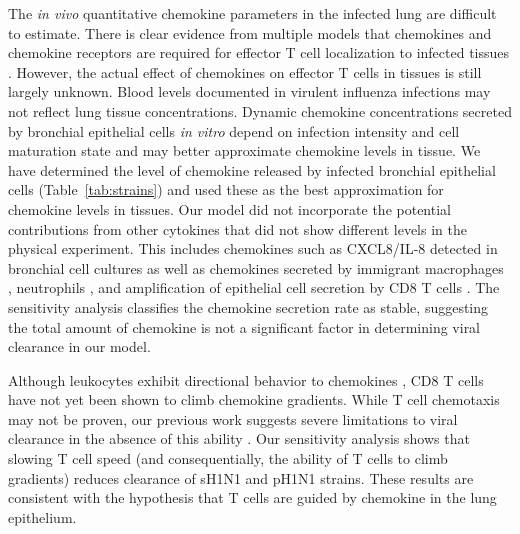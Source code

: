 \documentclass[preprint,10pt,numbers]{elsarticle}
\begin{document}
The \textit{in vivo} quantitative chemokine parameters in the infected lung are difficult to estimate.  There is clear evidence from multiple models that chemokines and chemokine receptors are required for effector T cell localization to infected tissues \citep{Christensen2004, Christensen2006, Dawson2000, DeLemos2005, Fadel2008, Gadhamsetty2014, Groom2011a, Groom2011, Hsieh2006, Klein2005, Kohlmeier2009, Kohlmeier2011, Thapa2008, Wareing2004, Wuest2008, Pawelek2012}. However, the actual effect of chemokines on effector T cells in tissues is still largely unknown.  Blood levels documented in virulent influenza infections \citep{DeJong2006} may not reflect lung tissue concentrations.  Dynamic chemokine concentrations secreted by bronchial epithelial cells \textit{in vitro} depend on infection intensity and cell maturation state \citep{Mitchell2011, Chan2010, Chan2005, Zeng2011} and may better approximate chemokine levels in tissue.  We have determined the level of chemokine released by infected bronchial epithelial cells (Table~\ref{tab:strains}) and used these as the best approximation for chemokine levels in tissues.  Our model did not incorporate  the potential contributions from other cytokines that did not show different levels in the physical experiment.  This includes chemokines such as CXCL8/IL-8 detected in bronchial cell cultures \citep{Matsukura1996, Arndt2002} as well as chemokines secreted by immigrant macrophages \citep{Julkunen2000}, neutrophils \citep{lim2015neutrophil}, and amplification of epithelial cell secretion by CD8 T cells \citep{Zhao2000}.  The sensitivity analysis classifies the chemokine secretion rate as stable, suggesting the total amount of chemokine is not a significant factor in determining viral clearance in our model.  

Although leukocytes exhibit directional behavior to chemokines \citep{LiJeon2002, McDonald2010}, CD8 T cells have not yet been shown to climb chemokine gradients.   While T cell chemotaxis may not be proven, our previous work suggests severe limitations to viral clearance in the absence of this ability \citep{Banerjee2011}.  Our sensitivity analysis shows that slowing T cell speed (and consequentially, the ability of T cells to climb gradients) reduces clearance of sH1N1 and pH1N1 strains.   These results are consistent with the hypothesis that T cells are guided by chemokine in the lung epithelium.

\end{document}
